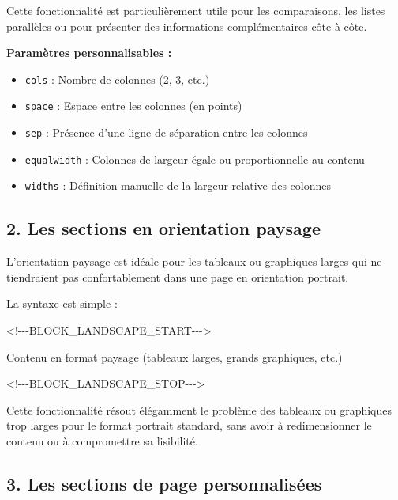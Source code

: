 \documentclass[
]{article}
\newenvironment{Shaded}{\begin{snugshade}}{\end{snugshade}}
\newcommand{\NormalTok}[1]{#1}
\providecommand{\tightlist}{%
  \setlength{\itemsep}{0pt}\setlength{\parskip}{0pt}}
\begin{document}
Cette fonctionnalité est particulièrement utile pour les comparaisons,
les listes parallèles ou pour présenter des informations complémentaires
côte à côte.

\textbf{Paramètres personnalisables :}

\begin{itemize}
\tightlist
\item
  \texttt{cols} : Nombre de colonnes (2, 3, etc.)
\item
  \texttt{space} : Espace entre les colonnes (en points)
\item
  \texttt{sep} : Présence d'une ligne de séparation entre les colonnes
\item
  \texttt{equalwidth} : Colonnes de largeur égale ou proportionnelle au
  contenu
\item
  \texttt{widths} : Définition manuelle de la largeur relative des
  colonnes
\end{itemize}

\subsection{2. Les sections en orientation
paysage}\label{les-sections-en-orientation-paysage}

L'orientation paysage est idéale pour les tableaux ou graphiques larges
qui ne tiendraient pas confortablement dans une page en orientation
portrait.

La syntaxe est simple :

\begin{Shaded}
\begin{Highlighting}[]
\NormalTok{\textless{}!{-}{-}{-}BLOCK\_LANDSCAPE\_START{-}{-}{-}\textgreater{}}

\NormalTok{Contenu en format paysage (tableaux larges, grands graphiques, etc.)}

\NormalTok{\textless{}!{-}{-}{-}BLOCK\_LANDSCAPE\_STOP{-}{-}{-}\textgreater{}}
\end{Highlighting}
\end{Shaded}

Cette fonctionnalité résout élégamment le problème des tableaux ou
graphiques trop larges pour le format portrait standard, sans avoir à
redimensionner le contenu ou à compromettre sa lisibilité.

\subsection{3. Les sections de page
personnalisées}\label{les-sections-de-page-personnalisuxe9es}
\end{document}
